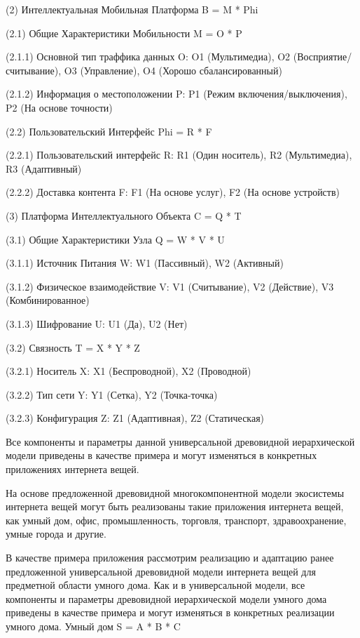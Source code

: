 (2) Интеллектуальная Мобильная Платформа B = M * Phi

(2.1) Общие Характеристики Мобильности M = O * P

(2.1.1) Основной тип траффика данных O: O1 (Мультимедиа), O2 (Восприятие/считывание), O3 (Управление), O4 (Хорошо сбалансированный)

(2.1.2) Информация о местоположении P: P1 (Режим включения/выключения), P2 (На основе точности)

(2.2) Пользовательский Интерфейс Phi = R * F

(2.2.1) Пользовательский интерфейс R: R1 (Один носитель), R2 (Мультимедиа), R3 (Адаптивный)

(2.2.2) Доставка контента F: F1 (На основе услуг), F2 (На основе устройств)

(3) Платформа Интеллектуального Объекта C = Q * T

(3.1) Общие Характеристики Узла Q = W * V * U

(3.1.1) Источник Питания W: W1 (Пассивный), W2 (Активный)

(3.1.2) Физическое взаимодействие V: V1 (Считывание), V2 (Действие), V3 (Комбинированное)

(3.1.3) Шифрование U: U1 (Да), U2 (Нет)

(3.2) Связность T = X * Y * Z

(3.2.1) Носитель X: X1 (Беспроводной), X2 (Проводной)

(3.2.2) Тип сети Y: Y1 (Сетка), Y2 (Точка-точка)

(3.2.3) Конфигурация Z: Z1 (Адаптивная), Z2 (Статическая)

Все компоненты и параметры данной универсальной древовидной иерархической модели приведены в качестве примера и могут изменяться в конкретных приложениях интернета вещей.

На основе предложенной древовидной многокомпонентной модели экосистемы интернета вещей могут быть реализованы такие приложения интернета вещей, как умный дом, офис, промышленность, торговля, транспорт, здравоохранение, умные города и другие.

В качестве примера приложения рассмотрим реализацию и адаптацию ранее предложенной универсальной древовидной модели интернета вещей для предметной области умного дома. Как и в универсальной модели, все компоненты и параметры древовидной иерархической модели умного дома приведены в качестве примера и могут изменяться в конкретных реализации умного дома.
Умный дом S = A * B * C

